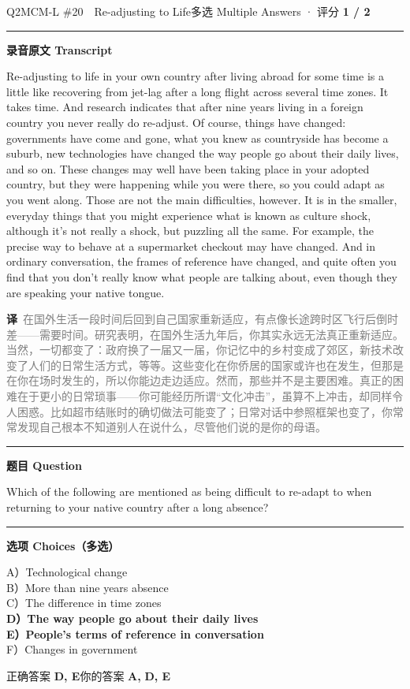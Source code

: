\documentclass[11pt]{article}
\newcommand{\ptesub}[1]{%
  \par\needspace{2\baselineskip}\smallskip
  {\color{cAccent}\rule[-0.2ex]{3pt}{1.05em}}\hspace{6pt}%
  {\bfseries\color{cHead}#1}\par\nopagebreak\smallskip}
\newcommand{\zh}[1]{{\footnotesize\textcolor{cNote}{\textbf{译}}\ \textcolor{gray}{#1}}}
\begin{document}
\begin{qblock}{Q2\quad MCM-L \#20\ \ Re-adjusting to Life}{多选 Multiple Answers · 评分 \textcolor{cAccent}{\bfseries 1 / 2}}
\ptesub{录音原文 Transcript}
\begin{promptbox}
Re-adjusting to life in your own country after living abroad for some time is a little like recovering from jet-lag after a long flight across several time zones. It takes time. And research indicates that after nine years living in a foreign country you never really do re-adjust. Of course, things have changed: governments have come and gone, what you knew as countryside has become a suburb, new technologies have changed the way people go about their daily lives, and so on. These changes may well have been taking place in your adopted country, but they were happening while you were there, so you could adapt as you went along. Those are not the main difficulties, however. It is in the smaller, everyday things that you might experience what is known as culture shock, although it's not really a shock, but puzzling all the same. For example, the precise way to behave at a supermarket checkout may have changed. And in ordinary conversation, the frames of reference have changed, and quite often you find that you don't really know what people are talking about, even though they are speaking your native tongue.
\end{promptbox}
\zh{在国外生活一段时间后回到自己国家重新适应，有点像长途跨时区飞行后倒时差——需要时间。研究表明，在国外生活九年后，你其实永远无法真正重新适应。当然，一切都变了：政府换了一届又一届，你记忆中的乡村变成了郊区，新技术改变了人们的日常生活方式，等等。这些变化在你侨居的国家或许也在发生，但那是在你在场时发生的，所以你能边走边适应。然而，那些并不是主要困难。真正的困难在于更小的日常琐事——你可能经历所谓“文化冲击”，虽算不上冲击，却同样令人困惑。比如超市结账时的确切做法可能变了；日常对话中参照框架也变了，你常常发现自己根本不知道别人在说什么，尽管他们说的是你的母语。}
\ptesub{题目 Question}
\begin{notebox}\small Which of the following are mentioned as being difficult to re-adapt to when returning to your native country after a long absence?\end{notebox}
\ptesub{选项 Choices（多选）}
{\small
A）Technological change\\
B）More than nine years absence\\
C）The difference in time zones\\
{\color{cFix}\textbf{D）The way people go about their daily lives}}\\
{\color{cFix}\textbf{E）People's terms of reference in conversation}}\\
F）Changes in government}
\smallskip\par
{\small 正确答案 \textcolor{cFix}{\bfseries D, E}\qquad 你的答案 {\color{cWrong}\bfseries A,} {\color{cFix}\bfseries D, E}}
\end{qblock}
\end{document}
